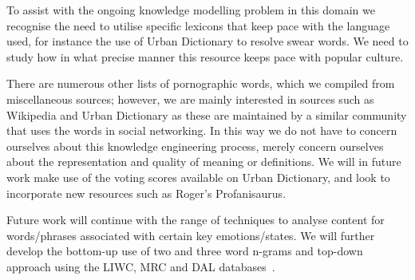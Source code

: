 \documentclass[letterpaper]{article}
\begin{document}
To assist with the ongoing knowledge modelling problem in this domain
we recognise the need to utilise specific lexicons that keep pace with
the language used, for instance the use of Urban Dictionary to resolve
swear words. We need to study how in what precise manner this resource
keeps pace with popular culture.

There are numerous other lists of pornographic words, which we
compiled from miscellaneous sources; however, we are mainly interested
in sources such as Wikipedia and Urban Dictionary as these are
maintained by a similar community that uses the words in social
networking. In this way we do not have to concern ourselves about this
knowledge engineering process, merely concern ourselves about the
representation and quality of meaning or definitions. We will in
future work make use of the voting scores available on Urban
Dictionary, and look to incorporate new resources such as Roger's
Profanisaurus.

Future work will continue with the range of techniques to analyse
content for words/phrases associated with certain key
emotions/states. We will further develop the bottom-up use of two and
three word n-grams and top-down approach using the LIWC, MRC and DAL
databases~\cite{iacobelli-et-al:2011}.




\end{document}
